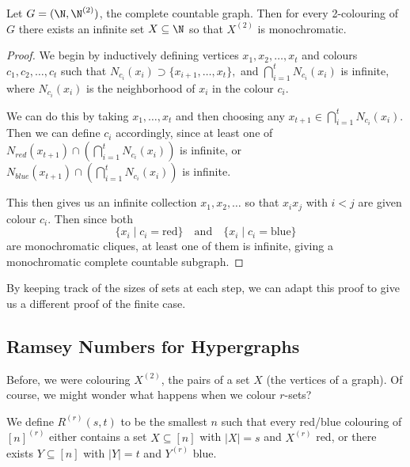 \begin{theorem}
	Let $G= (\N, \N^{(2)})$, the complete countable graph. Then for every 2-colouring of $G$ there exists an infinite set $X \subseteq \N$ so that $X^{(2)}$ is monochromatic.
\end{theorem}
\begin{proof}
	We begin by inductively defining vertices $x_1, x_2, \dots, x_t$ and colours $c_1, c_2, \dots, c_t$ such that 
	$N_{c_i}(x_i) \supset \{x_{i + 1}, \dots, x_{t}\},$
	and
	$
	\bigcap_{i = 1}^t N_{c_i}(x_i)
	$ is infinite, where $N_{c_i}(x_i)$ is the neighborhood of $x_i$ in the colour $c_i$.

	We can do this by taking $x_1, \dots, x_t$ and then choosing any $x_{t + 1} \in \bigcap_{i = 1}^t N_{c_i}(x_i)$. Then we can define $c_i$ accordingly, since at least one of $N_{red}(x_{t + 1}) \cap \left(\bigcap_{i = 1}^t N_{c_i}(x_i)\right)$ is infinite, or $N_{blue}(x_{t + 1}) \cap \left(\bigcap_{i = 1}^t N_{c_i}(x_i)\right)$ is infinite.

	This then gives us an infinite collection $x_1, x_2, \dots$ so that $x_i x_j$ with $i < j$ are given colour $c_i$. Then since both
	$$
	\{x_i \mid c_i = \text{red}\} \quad \text{and} \quad \{x_i \mid c_i = \text{blue}\}
	$$
	are monochromatic cliques, at least one of them is infinite, giving a monochromatic complete countable subgraph.
\end{proof}

\begin{remark}
	By keeping track of the sizes of sets at each step, we can adapt this proof to give us a different proof of the finite case.
\end{remark}

\subsection{Ramsey Numbers for Hypergraphs}

Before, we were colouring $X^{(2)}$, the pairs of a set $X$ (the vertices of a graph). Of course, we might wonder what happens when we colour $r$-sets?

\begin{definition}
	We define $R^{(r)}(s, t)$ to be the smallest $n$ such that every red/blue colouring of $[n]^{(r)}$ either contains a set $X \subseteq [n]$ with $|X| = s$ and $X^{(r)}$ red, or there exists $Y \subseteq[n]$ with $|Y| = t$ and $Y^{(r)}$ blue.
\end{definition}

